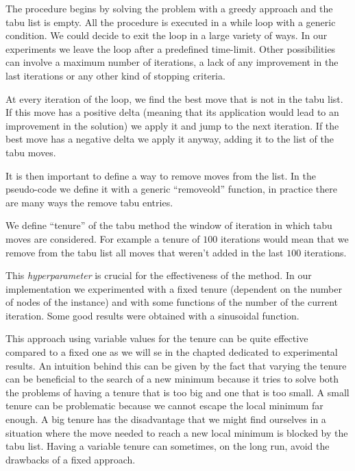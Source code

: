 \documentclass{article}
\begin{document}
The procedure begins by solving the problem with a greedy approach and the tabu list
is empty. All the procedure is executed in a while loop with a generic condition. We could
decide to exit the loop in a large variety of ways. In our experiments we leave the loop
after a predefined time-limit. Other possibilities can involve a maximum number of iterations, a lack of any improvement in the last iterations or any other kind of stopping criteria.

At every iteration of the loop, we find the best move that is not in the tabu list. If this move has a positive delta (meaning that its application would lead to an
improvement in the solution) we apply it and jump to the next iteration. If the best
move has a negative delta we apply it anyway, adding it to the list of the tabu moves.

It is then important to define a way to remove moves from the list. In the pseudo-code we define it with a generic ``removeold'' function, in practice there are many ways the remove tabu entries.

We define ``tenure'' of the tabu method the window of iteration in which tabu moves are considered. For example a tenure of $100$ iterations would mean that we remove
from the tabu list all moves that weren't added in the last $100$ iterations.

This \textit{hyperparameter} is crucial for the effectiveness of the method. In our implementation we experimented with a fixed tenure (dependent on the number of
nodes of the instance) and with some functions of the number of the current iteration. Some good results were obtained with a sinusoidal function.

This approach using variable values for the tenure can be quite effective compared to a fixed one as we will se in the chapted dedicated to experimental results.
An intuition behind this can be given by the fact that varying the tenure can be beneficial to the search of a new minimum because it tries to solve both the problems of having a tenure that is too big and one that is too small.
A small tenure can be problematic because we cannot escape the local minimum far enough. A big tenure has the disadvantage that we might find ourselves in a situation where the move needed to reach a new local minimum is blocked by the
tabu list. Having a variable tenure can sometimes, on the long run, avoid the drawbacks of a fixed approach.
\end{document}
